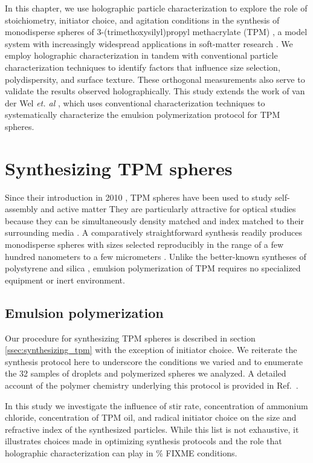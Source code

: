 In this chapter, we use holographic particle characterization
to explore the role of stoichiometry, initiator choice, and
agitation conditions in the synthesis of monodisperse spheres of
3-(trimethoxysilyl)propyl methacrylate (TPM) \cite{vanderwel17},
a model system with increasingly widespread applications
in soft-matter research \cite{sacanna11,liu16,vanderwel18}.
We employ holographic characterization
in tandem with conventional particle characterization
techniques to identify factors that influence size selection, polydispersity,
and surface texture.
These orthogonal measurements also serve to validate the results observed
holographically.
This study extends the work of van der Wel \emph{et. al} \cite{vanderwel17}, which
uses conventional characterization techniques to systematically
characterize the emulsion polymerization protocol for TPM spheres.

\section{Synthesizing TPM spheres}

Since their introduction in 2010 \cite{sacanna10}, TPM spheres have been used to
study self-assembly \cite{scanna13} and active matter \cite{palacci13}
They are particularly attractive for optical studies because they can be
simultaneously density matched and index matched to their surrounding
media \cite{liu16}.
A comparatively straightforward synthesis readily produces monodisperse spheres
with sizes selected reproducibly in the range of a few hundred nanometers to a
few micrometers \cite{liu16}.
Unlike the better-known syntheses of polystyrene \cite{goodwin1974} and
silica \cite{stober68},
emulsion polymerization of TPM requires no specialized equipment or
inert environment.

\subsection{Emulsion polymerization}
\label{ssec:polymerization}

Our procedure for synthesizing TPM spheres is described in section
\ref{ssec:synthesizing_tpm} with the
exception of initiator choice. We reiterate the synthesis protocol
here to underscore the conditions we varied and to enumerate the
\num{32} samples of droplets and polymerized spheres we analyzed.
A detailed account of the polymer chemistry underlying this
protocol is provided in Ref.~\cite{vanderwel17}.

In this study we investigate the influence of stir rate, concentration of ammonium chloride,
concentration of TPM oil, and radical initiator choice on the size and refractive index
of the synthesized particles. While this list is not exhaustive,
it illustrates choices made in optimizing synthesis protocols and the role
that holographic characterization can play in \% FIXME conditions.

